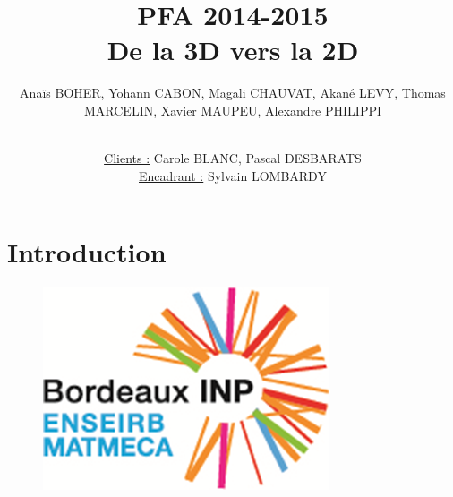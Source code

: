 \documentclass{beamer}
\title[PFA 2014-2015]{PFA 2014-2015 \\ \LARGE De la 3D vers la 2D} %
\author{Anaïs BOHER, Yohann CABON, Magali CHAUVAT, Akané LEVY, Thomas MARCELIN, Xavier MAUPEU, Alexandre PHILIPPI
\\ \and \\
\underline{Clients :} Carole BLANC, Pascal DESBARATS 
\\
\underline{Encadrant :} Sylvain LOMBARDY}
\institute[Enseirb-Matmeca] %
{École Nationale Supérieure d'Électronique, Informatique, Télécommunications, Mathématique et Mécanique de Bordeaux
}
\date{} %
\begin{document}
\graphicspath{{./images/}{.}}



\section{Introduction}

\begin{frame}
\titlepage %

\begin{figure}[B]
\vspace*{-1cm}
\includegraphics[scale=0.4]{logo.png}
\end{figure}
\end{frame}


%

\end{document}

